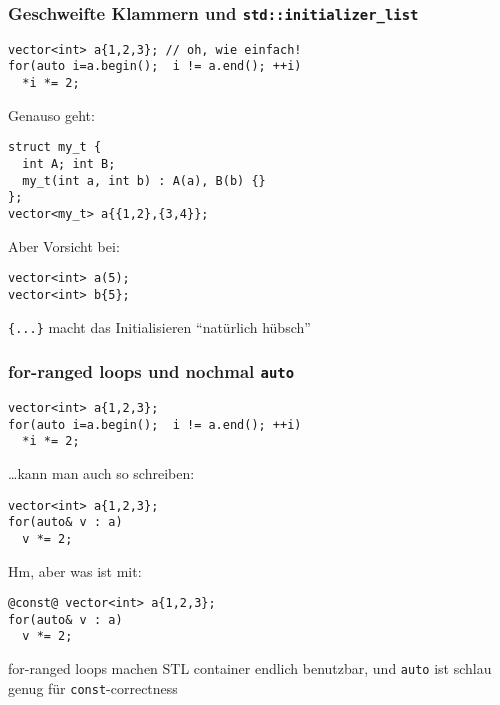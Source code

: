 \documentclass[t,ngerman,usepdftitle=false]{beamer}
\begin{document}
\begin{frame}[fragile]
  \frametitle{Geschweifte Klammern und \lstinline|std::initializer_list|}
\begin{lstlisting}
vector<int> a{1,2,3}; // oh, wie einfach!
for(auto i=a.begin();  i != a.end(); ++i)
  *i *= 2;
\end{lstlisting}

\pause
Genauso geht:
\begin{lstlisting}
struct my_t { 
  int A; int B;
  my_t(int a, int b) : A(a), B(b) {}
};
vector<my_t> a{{1,2},{3,4}};  
\end{lstlisting}

\pause
Aber {\color{red}Vorsicht} bei:\\
\begin{lstlisting}
vector<int> a(5);
vector<int> b{5};
\end{lstlisting}

\pause 
\begin{block}{}
  \centering
  \lstinline!{...}! macht das Initialisieren \enquote{natürlich hübsch}
\end{block}

\end{frame}


\begin{frame}[fragile]
  \frametitle{for-ranged loops und nochmal \lstinline!auto!}
\begin{lstlisting}
vector<int> a{1,2,3};
for(auto i=a.begin();  i != a.end(); ++i)
  *i *= 2;
\end{lstlisting}

\pause
\ldots{}kann man auch so schreiben:
\begin{lstlisting}
vector<int> a{1,2,3};
for(auto& v : a)
  v *= 2;
\end{lstlisting}

\pause
Hm, aber was ist mit:
\begin{lstlisting}
@const@ vector<int> a{1,2,3};
for(auto& v : a)
  v *= 2;
\end{lstlisting}

\pause
\begin{block}{}
  \centering
  for-ranged loops machen STL container endlich benutzbar,
  und \lstinline!auto! ist schlau genug für \lstinline!const!-correctness
\end{block}
  
\end{frame}
\end{document}
